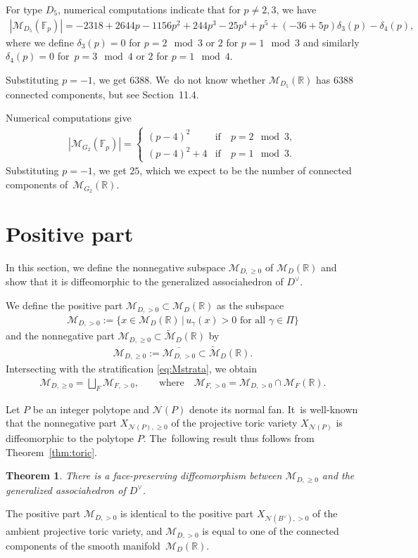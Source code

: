 \documentclass[10pt,a4paper]{amsart}
\def\R{{\mathbb R}}
\def\F{{\mathbb F}}
\def\M{{\mathcal{M}}}
\def\tM{{\widetilde {\mathcal{M}}}}
\def\N{{\mathcal{N}}}
\numberwithin{equation}{section}
\newtheorem{Theorem}{Theorem}[section]
\begin{document}
For type $D_5$, numerical computations indicate that for $p \neq 2,3 $, we have
\begin{gather*}
|\M_{D_5}(\F_p)|=-2318 + 2644 p - 1156 p^2 + 244 p^3 - 25 p^4 + p^5+ (-36+5 p) \delta_3 (p)- \delta_4 (p),
\end{gather*}
where we define $\delta_3 (p)=0$ for $p = 2 \mod 3$ or $2$ for $p = 1 \mod 3$ and similarly $\delta_4 (p)=0$ for~$p=3 \mod 4$ or $2$ for $p=1 \mod 4$.

Substituting $p=-1$, we get $6388$. We~do not know whether $\M_{D_5}(\R)$ has $6388$ connected components, but see Section~11.4.

\bigskip{} %
Numerical computations give
\begin{gather*}
|\M_{G_2}(\F_p)| = \begin{cases}
(p-4)^2 & \mbox{if}\quad p = 2 \mod 3,
\\
(p-4)^2 + 4& \mbox{if}\quad p = 1 \mod 3.
\end{cases}
\end{gather*}
Substituting $p = -1$, we get $25$, which we expect to be the number of connected components of~$\M_{G_2}(\R)$.

\section{Positive part}
In this section, we define the nonnegative subspace $\M_{D,\geq 0}$ of $\M_D(\R)$ and show that it is diffeomorphic to the generalized associahedron of $D^\vee$.

\bigskip{} %
We define the positive part $\M_{D,>0} \subset \M_D(\R)$ as the subspace
\begin{gather*}
\M_{D, >0} := \big\{x \in \M_D(\R) \,|\, u_\gamma(x) > 0 \text{ for all } \gamma \in \Pi\big\}
\end{gather*}
and the nonnegative part $\M_{D,\geq 0} \subset \tM_D(\R)$ by
\begin{gather*}
\M_{D,\geq 0} := \overline{\M_{D,>0}} \subset \tM_D(\R).
\end{gather*}
Intersecting with the stratification \eqref{eq:Mstrata}, we obtain
\begin{gather*}
\M_{D,\geq 0} = \bigsqcup_F \M_{F,>0}, \qquad \text{where} \quad \M_{F,>0} = \M_{D,>0} \cap \M_F(\R).
\end{gather*}

Let $P$ be an integer polytope and $\N(P)$ denote its normal fan. It~is well-known \cite[Chapter~4]{Ful} that the nonnegative part $X_{\N(P),\geq 0}$ of the projective toric variety $X_{\N(P)}$ is diffeomorphic to the polytope $P$. The~following result thus follows from Theorem~\ref{thm:toric}.
\begin{Theorem}\label{thm:pospart}
There is a face-preserving diffeomorphism between $\M_{D,\geq 0}$ and the generalized associahedron of $D^\vee$.
\end{Theorem}
The positive part $\M_{D,>0}$ is identical to the positive part $X_{\N(B^\vee),>0}$ of the ambient projective toric variety, and $\M_{D,>0}$ is equal to one of the connected components of the smooth manifold~$\M_D(\R)$.
\end{document}
